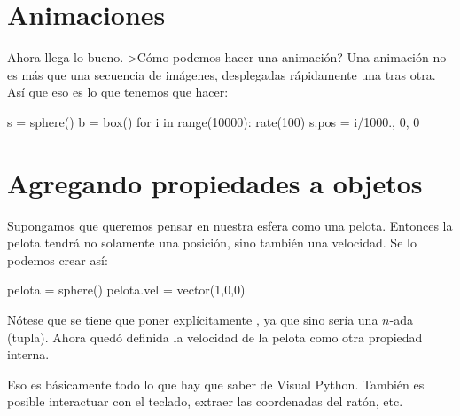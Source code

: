 \section{Animaciones}
Ahora llega lo bueno. >Cómo podemos hacer una animación? Una animación no es más que una secuencia de imágenes, desplegadas rápidamente una tras otra. Así que eso es lo que tenemos que hacer:
\begin{python}
s = sphere()
b = box()
for i in range(10000):
  rate(100)
  s.pos = i/1000., 0, 0
\end{python}

\section{Agregando propiedades a objetos}
Supongamos que queremos pensar en nuestra esfera como una pelota. Entonces la pelota tendrá no solamente una posición, sino también una velocidad.  Se lo podemos crear así:
\begin{python}
pelota = sphere()
pelota.vel = vector(1,0,0)
\end{python}
Nótese que se tiene que poner explícitamente , ya que sino sería una $n$-ada (tupla).
Ahora quedó definida la velocidad de la pelota como otra propiedad interna.


Eso es básicamente todo lo que hay que saber de Visual Python. También es posible interactuar con el teclado, extraer las coordenadas del ratón, etc.






